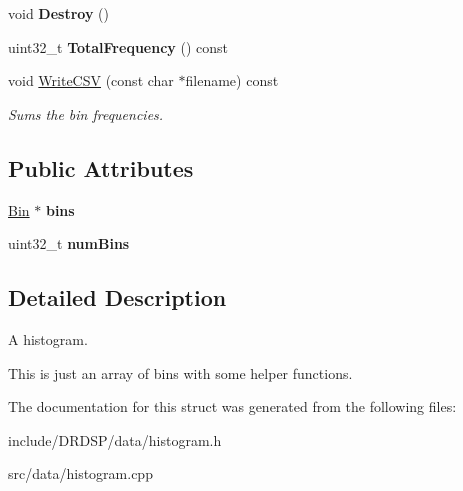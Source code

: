 \begin{DoxyCompactItemize}
\item 
\hypertarget{struct_d_r_d_s_p_1_1_histogram_a84577ee394d1017b16aa4229ff7f5904}{void {\bfseries Destroy} ()}\label{struct_d_r_d_s_p_1_1_histogram_a84577ee394d1017b16aa4229ff7f5904}

\item 
\hypertarget{struct_d_r_d_s_p_1_1_histogram_adeb7a588aa66fe2e6dd0d851ea92d625}{uint32\-\_\-t {\bfseries Total\-Frequency} () const }\label{struct_d_r_d_s_p_1_1_histogram_adeb7a588aa66fe2e6dd0d851ea92d625}

\item 
\hypertarget{struct_d_r_d_s_p_1_1_histogram_a849de9ad07ff6c468dad15a9951a3f81}{void \hyperlink{struct_d_r_d_s_p_1_1_histogram_a849de9ad07ff6c468dad15a9951a3f81}{Write\-C\-S\-V} (const char $\ast$filename) const }\label{struct_d_r_d_s_p_1_1_histogram_a849de9ad07ff6c468dad15a9951a3f81}

\begin{DoxyCompactList}\small\item\em Sums the bin frequencies. \end{DoxyCompactList}\end{DoxyCompactItemize}
\subsection*{Public Attributes}
\begin{DoxyCompactItemize}
\item 
\hypertarget{struct_d_r_d_s_p_1_1_histogram_a22b2c10bc25d799a1d32dec46887dcb0}{\hyperlink{struct_d_r_d_s_p_1_1_bin}{Bin} $\ast$ {\bfseries bins}}\label{struct_d_r_d_s_p_1_1_histogram_a22b2c10bc25d799a1d32dec46887dcb0}

\item 
\hypertarget{struct_d_r_d_s_p_1_1_histogram_a0958a362ffa72e63c899f6622c2aa638}{uint32\-\_\-t {\bfseries num\-Bins}}\label{struct_d_r_d_s_p_1_1_histogram_a0958a362ffa72e63c899f6622c2aa638}

\end{DoxyCompactItemize}


\subsection{Detailed Description}
A histogram. 

This is just an array of bins with some helper functions. 

The documentation for this struct was generated from the following files\-:\begin{DoxyCompactItemize}
\item 
include/\-D\-R\-D\-S\-P/data/histogram.\-h\item 
src/data/histogram.\-cpp\end{DoxyCompactItemize}
